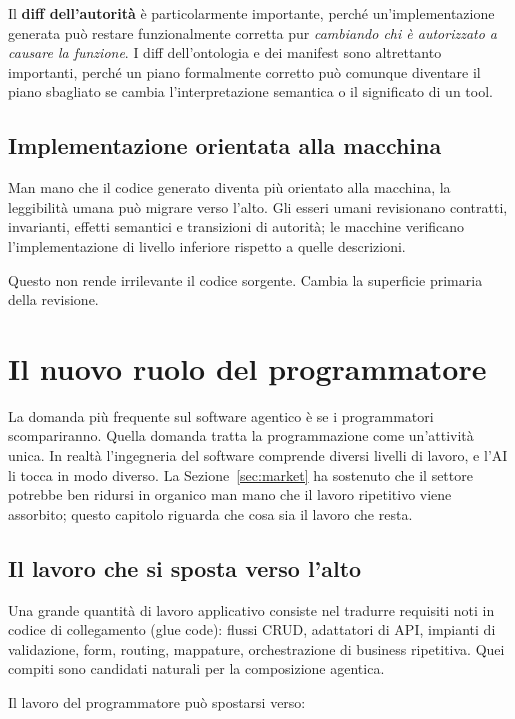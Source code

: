 \documentclass[10pt,oneside,openany]{book}
\begin{document}
Il \textbf{diff dell'autorità} è particolarmente importante, perché un'implementazione generata può restare funzionalmente corretta pur \emph{cambiando chi è autorizzato a causare la funzione}. I diff dell'ontologia e dei manifest sono altrettanto importanti, perché un piano formalmente corretto può comunque diventare il piano sbagliato se cambia l'interpretazione semantica o il significato di un tool.

\section{Implementazione orientata alla macchina}
Man mano che il codice generato diventa più orientato alla macchina, la leggibilità umana può migrare verso l'alto. Gli esseri umani revisionano contratti, invarianti, effetti semantici e transizioni di autorità; le macchine verificano l'implementazione di livello inferiore rispetto a quelle descrizioni.

Questo non rende irrilevante il codice sorgente. Cambia la superficie primaria della revisione.

\chapter{Il nuovo ruolo del programmatore}

La domanda più frequente sul software agentico è se i programmatori scompariranno. Quella domanda tratta la programmazione come un'attività unica. In realtà l'ingegneria del software comprende diversi livelli di lavoro, e l'AI li tocca in modo diverso. La Sezione~\ref{sec:market} ha sostenuto che il settore potrebbe ben ridursi in organico man mano che il lavoro ripetitivo viene assorbito; questo capitolo riguarda che cosa sia il lavoro che resta.

\section{Il lavoro che si sposta verso l'alto}
Una grande quantità di lavoro applicativo consiste nel tradurre requisiti noti in codice di collegamento (glue code): flussi CRUD, adattatori di API, impianti di validazione, form, routing, mappature, orchestrazione di business ripetitiva. Quei compiti sono candidati naturali per la composizione agentica.

Il lavoro del programmatore può spostarsi verso:
\end{document}
